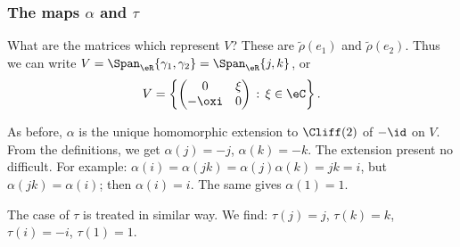 \subsubsection{The maps \texorpdfstring{$\alpha$}{a} and \texorpdfstring{$\tau$}{t}}

What are the matrices which represent $V$? These are $\tilde\rho(e_1)$ and $\tilde\rho(e_2)$. Thus we can write $V=\Span_{\eR}\{\gamma_1,\gamma_2\}=\Span_{\eR}\{j,k\}$, or
\[
	V=\left\{\begin{pmatrix}
		0     & \xi \\
		-\oxi & 0
	\end{pmatrix}\,:\,\xi\in\eC\right\}.
\]

As before, $\alpha$ is the unique homomorphic extension to $\Cliff(2)$ of $-\id$ on $V$. From the definitions, we get $\alpha(j)=-j$, $\alpha(k)=-k$.
The extension present no difficult. For example: $\alpha(i)=\alpha(jk)=\alpha(j)\alpha(k)=jk=i$, but $\alpha(jk)=\alpha(i)$; then $\alpha(i)=i$. The same gives $\alpha(1)=1$.

The case of $\tau$ is treated in similar way. We find: $\tau(j)=j$, $\tau(k)=k$, $\tau(i)=-i$, $\tau(1)=1$.

